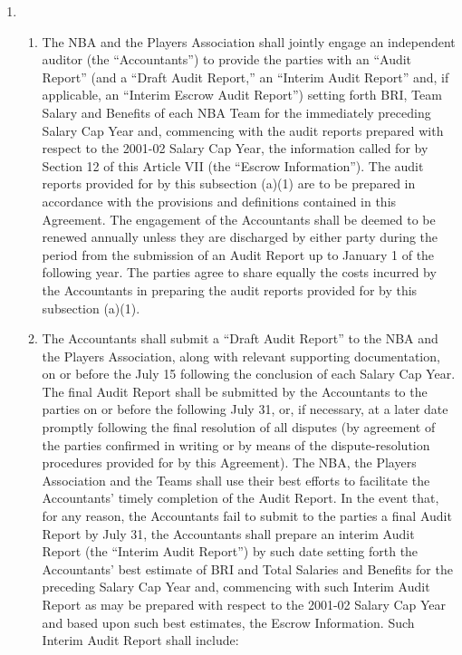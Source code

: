 \documentclass[
]{book}
\providecommand{\tightlist}{%
  \setlength{\itemsep}{0pt}\setlength{\parskip}{0pt}}
\begin{document}
\begin{enumerate}
\def\labelenumi{(\alph{enumi})}
\item
  \begin{enumerate}
  \def\labelenumii{(\arabic{enumii})}
  \tightlist
  \item
    The NBA and the Players Association shall jointly engage an independent auditor (the ``Accountants'') to provide the parties with an ``Audit Report'' (and a ``Draft Audit Report,'' an ``Interim Audit Report'' and, if applicable, an ``Interim Escrow Audit Report'') setting forth BRI, Team Salary and Benefits of each NBA Team for the immediately preceding Salary Cap Year and, commencing with the audit reports prepared with respect to the 2001-02 Salary Cap Year, the information called for by Section 12 of this Article VII (the ``Escrow Information''). The audit reports provided for by this subsection (a)(1) are to be prepared in accordance with the provisions and definitions contained in this Agreement. The engagement of the Accountants shall be deemed to be renewed annually unless they are discharged by either party during the period from the submission of an Audit Report up to January 1 of the following year. The parties agree to share equally the costs incurred by the Accountants in preparing the audit reports provided for by this subsection (a)(1).
  \item
    The Accountants shall submit a ``Draft Audit Report'' to the NBA and the Players Association, along with relevant supporting documentation, on or before the July 15 following the conclusion of each Salary Cap Year. The final Audit Report shall be submitted by the Accountants to the parties on or before the following July 31, or, if necessary, at a later date promptly following the final resolution of all disputes (by agreement of the parties confirmed in writing or by means of the dispute-resolution procedures provided for by this Agreement). The NBA, the Players Association and the Teams shall use their best efforts to facilitate the Accountants' timely completion of the Audit Report. In the event that, for any reason, the Accountants fail to submit to the parties a final Audit Report by July 31, the Accountants shall prepare an interim Audit Report (the ``Interim Audit Report'') by such date setting forth the Accountants' best estimate of BRI and Total Salaries and Benefits for the preceding Salary Cap Year and, commencing with such Interim Audit Report as may be prepared with respect to the 2001-02 Salary Cap Year and based upon such best estimates, the Escrow Information. Such Interim Audit Report shall include:


\end{enumerate}
\end{enumerate}
\end{document}
